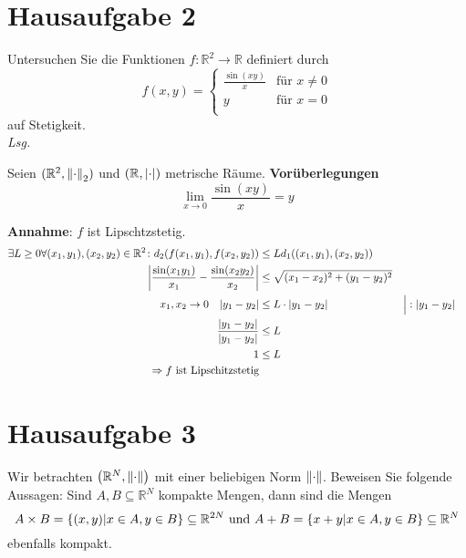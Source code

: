 \documentclass{scrreprt}
\begin{document}
\newpage
\section*{Hausaufgabe 2}

Untersuchen Sie die Funktionen $f \colon \mathbb{R}^2 \to \mathbb{R}$ definiert
durch
\[
  f(x, y) = \begin{cases}
    \frac{\sin(xy)}{x} & \text{für } x \ne 0 \\
    y & \text{für } x = 0 \\
  \end{cases}
\]
auf Stetigkeit. \\

\textit{Lsg.}
\begin{center}
\end{center}

Seien $(\mathbb{R}^2, \norm{\cdot}_2)$ und $(\mathbb{R}, \abs{\cdot})$
metrische Räume. \textbf{Vorüberlegungen}
\[
  \lim_{x \to 0} \frac{\sin(xy)}{x} = y
\]

\textbf{Annahme}: $f$ ist Lipschtzstetig.
\begin{align*}
  \exists L \geq 0 \forall (x_1, y_1), (x_2, y_2) \in \mathbb{R}^2 \colon d_2(f(x_1, y_1), f(x_2, y_2)) &\leq L d_1((x_1, y_1), (x_2, y_2)) \\
  \abs{\frac{\sin(x_1y_1)}{x_1} - \frac{\sin(x_2y_2)}{x_2}} &\leq\sqrt{(x_1 - x_2)^2 + (y_1 - y_2)^2} \\
x_1, x_2 \to 0 \quad  \abs{y_1 - y_2} &\leq L \cdot \abs{y_1 - y_2} && \Big| :\abs{y_1 - y_2} \\
  \frac{\abs{y_1 - y_2}}{\abs{y_1 - y_2}} &\leq L \\
  1 &\leq L \\
  \Rightarrow f \text{ ist Lipschitzstetig}
\end{align*}

\newpage
\section*{Hausaufgabe 3}

Wir betrachten $\qty(\mathbb{R}^N, \norm{\cdot})$ mit einer beliebigen Norm
$\norm{\cdot}$.
Beweisen Sie folgende Aussagen: Sind $A, B \subseteq \mathbb{R}^N$ kompakte
Mengen, dann sind die Mengen
\[
  A \times B = \qty{(x, y) \middle| x \in A, y \in B} \subseteq \mathbb{R}^{2N}
  \text{ und }
  A + B = \qty{x + y \middle| x \in A, y \in B} \subseteq \mathbb{R}^N
\]
ebenfalls kompakt.
\end{document}
